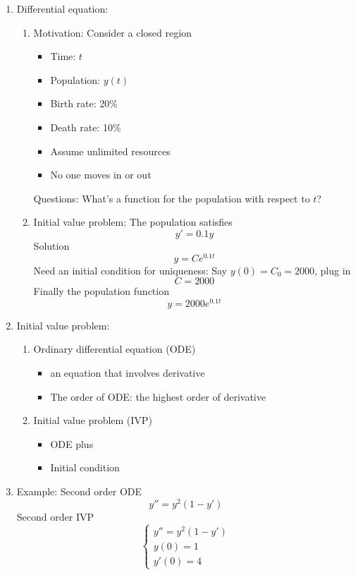 \documentclass{article}
\theoremstyle{remark}
\begin{document}
\begin{enumerate}
\item  Differential equation: 
\begin{enumerate}
\item Motivation: Consider a closed region
\begin{itemize}
\item Time: $t$
\item Population: $y(t)$
\item Birth rate: 20\%
\item Death rate: 10\%
\item Assume unlimited resources
\item No one moves in or out
\end{itemize}
Questions: What's a function for the population with respect to $t$?

\item Initial value problem: The population satisfies
$$
y' = 0.1y
$$
Solution
$$
y = Ce^{0.1t}
$$
Need an initial condition for uniqueness: Say $y(0)= C_0 = 2000$, plug in 
$$
C = 2000
$$
Finally the population function
$$
y = 2000e^{0.1t}
$$
\end{enumerate}

\item Initial value problem: 
\begin{enumerate}
\item Ordinary differential equation (ODE)
\begin{itemize}
\item an equation that involves derivative
\item The order of ODE: the highest order of derivative 
\end{itemize}
\item Initial value problem (IVP)
\begin{itemize}
\item ODE plus
\item Initial condition
\end{itemize}
\end{enumerate}

\item Example: Second order ODE
$$
y'' = y^2(1-y')
$$
Second order IVP
$$
\left\{\begin{array}{l}
y'' = y^2(1-y')\\
y(0) = 1\\
y'(0) = 4
\end{array}\right.
$$


\end{enumerate}
\end{document}
